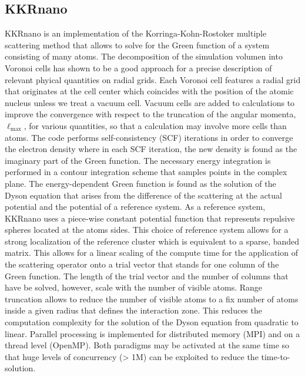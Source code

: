\documentclass{llncs}
\newcommand{\ellmax}{\ell_{\mathrm{max}}}
\def\KKRnano{{KKRnano}}
\begin{document}
\subsection{KKRnano} \label{section:kkrnano}
\KKRnano{} is an implementation of the Korringa-Kohn-Rostoker multiple scattering method \cite{korringa, kohn-rostoker}
that allows to solve for the Green function of a system consisting of many atoms.
The decomposition of the simulation volumen into Voronoi cells has shown to be a good
approach for a precise description of relevant phyical quantities on radial grids.
Each Voronoi cell features a radial grid that originates at the cell center
which coincides with the position of the atomic nucleus unless we treat a vacuum cell.
Vacuum cells are added to calculations to improve the convergence with respect to the truncation of
the angular momenta, $\ellmax$, for various quantities, so that a calculation may involve more cells than atoms.
The code performs self-consistency (SCF) iterations in order to converge the electron density
where in each SCF iteration, the new density is found as the imaginary part of the Green function.
The necessary energy integration is performed in a contour integration scheme that
samples points in the complex plane.
The energy-dependent Green function is found as the solution of the Dyson equation
that arises from the difference of the scattering at the actual potential and the potential 
of a reference system. As a reference system, \KKRnano{} uses a piece-wise constant potential
function that represents repulsive spheres located at the atoms sides.
This choice of reference system allows for a strong localization of the reference cluster
which is equivalent to a sparse, banded matrix. 
This allows for a linear scaling of the compute time for the application of the scattering operator
onto a trial vector that stands for one column of the Green function. 
The length of the trial vector and the number of columns that have be solved, however, scale with
the number of visible atoms.
Range truncation allows to reduce the number of visible atoms to a fix number 
of atoms inside a given radius that defines the interaction zone. This reduces the computation
complexity for the solution of the Dyson equation from quadratic to linear.
Parallel processing is implemented for distributed memory (MPI) and on a thread level (OpenMP).
Both paradigms may be activated at the same time so that huge levels of concurrency 
(> 1M) can be exploited to reduce the time-to-solution.
\end{document}
